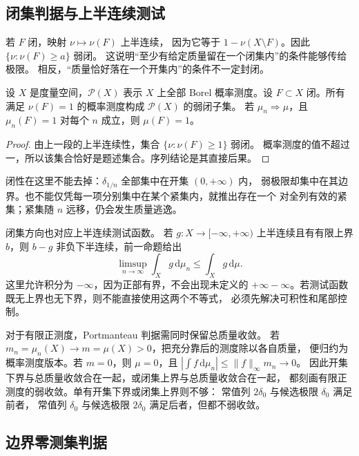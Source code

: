 \subsection{闭集判据与上半连续测试}
\label{b1:subsec:120203}

若 \(F\) 闭，映射 \(\nu\mapsto\nu(F)\) 上半连续，
因为它等于 \(1-\nu(X\setminus F)\)。因此 \(\{\nu:\nu(F)\geq a\}\) 弱闭。
这说明“至少有给定质量留在一个闭集内”的条件能够传给极限。
相反，“质量恰好落在一个开集内”的条件不一定封闭。

\begin{proposition}\label{b1:prop:weak-closed-support}
设 \(X\) 是度量空间，\(\mathcal P(X)\) 表示 \(X\) 上全部 Borel 概率测度。设 \(F\subset X\) 闭。所有满足 \(\nu(F)=1\) 的概率测度构成 \(\mathcal P(X)\) 的弱闭子集。
若 \(\mu_n\Rightarrow\mu\)，且 \(\mu_n(F)=1\) 对每个 \(n\) 成立，则 \(\mu(F)=1\)。
\end{proposition}
\begin{proof}
由上一段的上半连续性，集合 \(\{\nu:\nu(F)\geq1\}\) 弱闭。
概率测度的值不超过一，所以该集合恰好是题述集合。序列结论是其直接后果。
\end{proof}

闭性在这里不能去掉：\(\delta_{1/n}\) 全部集中在开集 \((0,+\infty)\) 内，
弱极限却集中在其边界。也不能仅凭每一项分别集中在某个紧集内，就推出存在一个
对全列有效的紧集；紧集随 \(n\) 远移，仍会发生质量逃逸。

\ProseParagraphBreak

闭集方向也对应上半连续测试函数。
若 \(g:X\to[-\infty,+\infty)\) 上半连续且有有限上界 \(b\)，则
\(b-g\) 非负下半连续，前一命题给出
\[
 \limsup_{n\to\infty}\int_X g\,\mathrm{d}\mu_n\leq\int_X g\,\mathrm{d}\mu.
\]
这里允许积分为 \(-\infty\)，因为正部有界，不会出现未定义的
\(+\infty-\infty\)。若测试函数既无上界也无下界，则不能直接使用这两个不等式，
必须先解决可积性和尾部控制。

\ProseParagraphBreak

对于有限正测度，Portmanteau 判据需同时保留总质量收敛。
若 \(m_n=\mu_n(X)\to m=\mu(X)>0\)，把充分靠后的测度除以各自质量，
便归约为概率测度版本。若 \(m=0\)，则 \(\mu=0\)，且
\(\left|\int f\,\mathrm{d}\mu_n\right|\leq\|f\|_\infty m_n\to0\)。
因此开集下界与总质量收敛合在一起，或闭集上界与总质量收敛合在一起，
都刻画有限正测度的弱收敛。单有开集下界或闭集上界则不够：
常值列 \(2\delta_0\) 与候选极限 \(\delta_0\) 满足前者，
常值列 \(\delta_0\) 与候选极限 \(2\delta_0\) 满足后者，但都不弱收敛。

\subsection{边界零测集判据}
\label{b1:subsec:120204}

